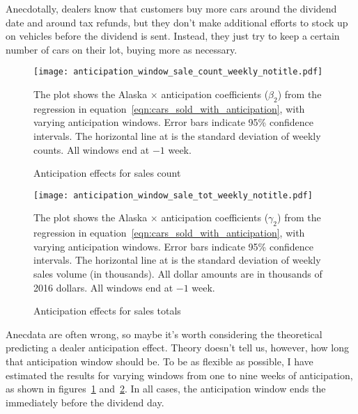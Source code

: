 \documentclass[11pt,letterpaper,oneside]{article}
\newcommand{\snippet}[1]{\hspace{-0.15em}}
\begin{document}
Anecdotally, dealers know that customers buy more cars around the dividend date and around tax refunds, but they don't make additional efforts to stock up on vehicles before the dividend is sent.
Instead, they just try to keep a certain number of cars on their lot, buying more as necessary.

\begin{figure}[hbt]
    \caption{Anticipation effects for sales count}
    \label{fig:anticipation_window_sale_count}
    \texttt{[image: anticipation\_window\_sale\_count\_weekly\_notitle.pdf]}

    {\footnotesize
    The plot shows the Alaska $\times$ anticipation coefficients ($\beta_2$) from the regression in equation~\ref{eqn:cars_sold_with_anticipation}, with varying anticipation windows.
    Error bars indicate 95\% confidence intervals.
    The horizontal line at \snippet{sales_count_weekly_std_dev.tex} is the standard deviation of weekly counts.
    All windows end at $-1$ week.
    }

\end{figure}
\begin{figure}[hbt]
     \caption{Anticipation effects for sales totals}
     \label{fig:anticipation_window_sale_tot}
        \texttt{[image: anticipation\_window\_sale\_tot\_weekly\_notitle.pdf]}

    {\footnotesize
    The plot shows the Alaska $\times$ anticipation coefficients ($\gamma_2$) from the regression in equation~\ref{eqn:cars_sold_with_anticipation}, with varying anticipation windows.
    Error bars indicate 95\% confidence intervals.
    The horizontal line at \snippet{sales_tot_weekly_thousands_std_dev.tex} is the standard deviation of weekly sales volume (in thousands).
    All dollar amounts are in thousands of 2016 dollars.
    All windows end at $-1$ week.
    }
\end{figure}


Anecdata are often wrong, so maybe it's worth considering the theoretical predicting a dealer anticipation effect.
Theory doesn't tell us, however, how long that anticipation window should be.
To be as flexible as possible, I have estimated the results for varying windows from one to nine weeks of anticipation, as shown in figures~\ref{fig:anticipation_window_sale_count} and~\ref{fig:anticipation_window_sale_tot}.
In all cases, the anticipation window ends the immediately before the dividend day.
\end{document}

